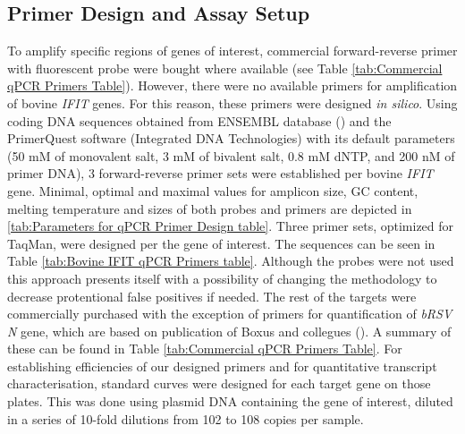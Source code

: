\subsection{Primer Design and Assay Setup} \label{subsec:Primer Design and Assay Setup}
To amplify specific regions of genes of interest, commercial forward-reverse primer with fluorescent probe were bought where available (see Table \ref{tab:Commercial qPCR Primers Table}). However, there were no available primers for amplification of bovine \textit{IFIT} genes. For this reason, these primers were designed \textit{in silico}. Using coding DNA sequences obtained from ENSEMBL database (\cite{Cunningham2022Ensembl2022}) and the PrimerQuest software (Integrated DNA Technologies) with its default parameters (50 mM of monovalent salt, 3 mM of bivalent salt, 0.8 mM dNTP, and 200 nM of primer DNA), 3 forward-reverse primer sets were established per bovine \textit{IFIT} gene. Minimal, optimal and maximal values for amplicon size, GC content, melting temperature and sizes of both probes and primers are depicted in \ref{tab:Parameters for qPCR Primer Design table}. Three primer sets, optimized for TaqMan, were designed per the gene of interest. The sequences can be seen in Table \ref{tab:Bovine IFIT qPCR Primers table}. Although the probes were not used this approach presents itself with a possibility of changing the methodology to decrease protentional false positives if needed. The rest of the targets were commercially purchased with the exception of primers for quantification of \textit{bRSV N} gene, which are based on publication of Boxus and collegues (\cite{Boxus2005RealVirus}). A summary of these can be found in Table \ref{tab:Commercial qPCR Primers Table}. For establishing efficiencies of our designed primers and for quantitative transcript characterisation, standard curves were designed for each target gene on those plates. This was done using plasmid DNA containing the gene of interest, diluted in a series of 10-fold dilutions from 102 to 108 copies per sample.

